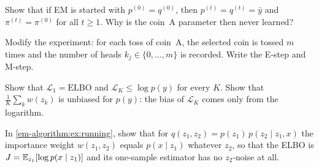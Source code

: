 \begin{notechapter}
\begin{exercise}\label{em-algorithm:exr:2}
Show that if EM is started with $p^{(0)} = q^{(0)}$, then $p^{(t)} = q^{(t)} = \bar y$ and
$\pi^{(t)} = \pi^{(0)}$ for all $t\geq1$. Why is the coin~A parameter then never
learned?
\end{exercise}

\begin{exercise}\label{em-algorithm:exr:3}
Modify the experiment: for each toss of coin~A, the selected coin is tossed $m$
times and the number of heads $k_j\in\{0,\dots,m\}$ is recorded. Write the E-step
and M-step.
\end{exercise}

\begin{exercise}\label{em-algorithm:exr:4}
Show that $\mathcal L_1 = \mathrm{ELBO}$ and $\mathcal L_K\leq\log p(y)$ for every $K$. Show
that $\frac1K\sum_kw(z_k)$ is unbiased for $p(y)$: the bias of $\mathcal L_K$ comes only from
the logarithm.
\end{exercise}

\begin{exercise}\label{em-algorithm:exr:5}
In \cref{em-algorithm:ex:running}, show that for $q(z_1,z_2) = p(z_1)\,p(z_2\mid z_1,x)$ the
importance weight $w(z_1,z_2)$ equals $p(x\mid z_1)$ whatever $z_2$, so that the ELBO is
$J = \mathbb{E}_{z_1}[\log p(x\mid z_1)]$ and its one-sample estimator has no $z_2$-noise at all.
\end{exercise}
\end{notechapter}
